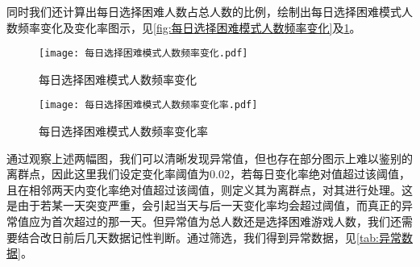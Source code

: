 \documentclass{MathModeling}
\begin{document}
	同时我们还计算出每日选择困难人数占总人数的比例，绘制出每日选择困难模式人数频率变化及变化率图示，见\textcolor{blue}{\cref{fig:每日选择困难模式人数频率变化}}及\textcolor{blue}{\cref{fig:每日选择困难模式人数频率变化率}}。

	\begin{figure}[H]
		\centering
		\begin{minipage}{0.48\linewidth}
			\centering
			\texttt{[image: 每日选择困难模式人数频率变化.pdf]}
			\caption{每日选择困难模式人数频率变化}
			\label{fig:每日选择困难模式人数频率变化}
		\end{minipage}
		\begin{minipage}{0.48\linewidth}
			\centering
			\texttt{[image: 每日选择困难模式人数频率变化率.pdf]}
			\caption{每日选择困难模式人数频率变化率}
			\label{fig:每日选择困难模式人数频率变化率}
		\end{minipage}
	\end{figure}
	通过观察上述两幅图，我们可以清晰发现异常值，但也存在部分图示上难以鉴别的离群点，因此这里我们设定变化率阈值为$0.02$，若每日变化率绝对值超过该阈值，且在相邻两天内变化率绝对值超过该阈值，则定义其为离群点，对其进行处理。这是由于若某一天突变严重，会引起当天与后一天变化率均会超过阈值，而真正的异常值应为首次超过的那一天。但异常值为总人数还是选择困难游戏人数，我们还需要结合改日前后几天数据记性判断。通过筛选，我们得到异常数据，见\textcolor{blue}{\cref{tab:异常数据}}。
\begin{table}[H]
	\centering
	\caption{异常数据分析}
	\label{tab:异常数据}
\end{table}
\end{document}

